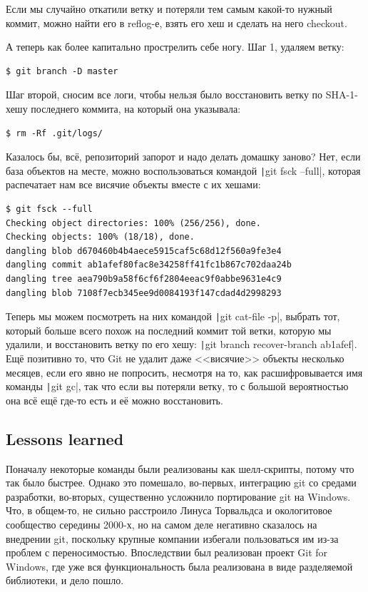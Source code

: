 \documentclass{../text-style}
\begin{document}
Если мы случайно откатили ветку и потеряли тем самым какой-то нужный коммит, можно найти его в reflog-е, взять его хеш и сделать на него checkout.

А теперь как более капитально прострелить себе ногу. Шаг 1, удаляем ветку:

\begin{verbatim}
$ git branch -D master
\end{verbatim}

Шаг второй, сносим все логи, чтобы нельзя было восстановить ветку по SHA-1-хешу последнего коммита, на который она указывала:

\begin{verbatim}
$ rm -Rf .git/logs/
\end{verbatim}

Казалось бы, всё, репозиторий запорот и надо делать домашку заново? Нет, если база объектов на месте, можно воспользоваться командой \texttt|git fsck --full|, которая распечатает нам все висячие объекты вместе с их хешами:

\begin{verbatim}
$ git fsck --full
Checking object directories: 100% (256/256), done.
Checking objects: 100% (18/18), done.
dangling blob d670460b4b4aece5915caf5c68d12f560a9fe3e4
dangling commit ab1afef80fac8e34258ff41fc1b867c702daa24b
dangling tree aea790b9a58f6cf6f2804eeac9f0abbe9631e4c9
dangling blob 7108f7ecb345ee9d0084193f147cdad4d2998293
\end{verbatim}

Теперь мы можем посмотреть на них командой \texttt|git cat-file -p|, выбрать тот, который больше всего похож на последний коммит той ветки, которую мы удалили, и восстановить ветку по его хешу: \texttt|git branch recover-branch ab1afef|. Ещё позитивно то, что Git не удалит даже <<висячие>> объекты несколько месяцев, если его явно не попросить, несмотря на то, как расшифровывается имя команды \texttt|git gc|, так что если вы потеряли ветку, то с большой вероятностью она всё ещё где-то есть и её можно восстановить.

\subsection{Lessons learned}

Поначалу некоторые команды были реализованы как шелл-скрипты, потому что так было быстрее. Однако это помешало, во-первых, интеграцию git со средами разработки, во-вторых, существенно усложнило портирование git на Windows. Что, в общем-то, не сильно расстроило Линуса Торвальдса и окологитовое сообщество середины 2000-х, но на самом деле негативно сказалось на внедрении git, поскольку крупные компании избегали пользоваться им из-за проблем с переносимостью. Впоследствии был реализован проект Git for Windows, где уже вся функциональность была реализована в виде разделяемой библиотеки, и дело пошло.
\end{document}
